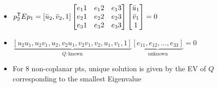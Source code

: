 \begin{itemize}
\begin{itemize}
            \item $p_2^{\mathsf{T}} E p_1 = [\bar u_2, \bar v_2, 1]
                \begin{bmatrix}
                    e_11 & e_12 & e_13\\
                    e_21 & e_22 & e_23\\
                    e_31 & e_32 & e_33
                \end{bmatrix}
                \begin{bmatrix}
                    \bar u_1\\
                    \bar v_1\\
                    1
                \end{bmatrix} = 0$
            \item $\underbrace{[u_2u_1, u_2v_1, u_2, v_2u_1, v_2v_1, v_2, u_1, v_1, 1]}_{Q: \text{known}}\underbrace{[e_{11}, e_{12}, \dots, e_{33}]}_{\text{unknown}} = 0$
            \item For $8$ non-coplanar pts, unique solution is given by the EV of $Q$ corresponding to the smallest Eigenvalue
        \end{itemize}
\end{itemize}
